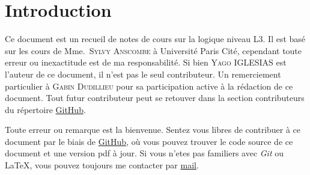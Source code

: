 \section{Introduction}

Ce document est un recueil de notes de cours sur la logique niveau L3. Il est
basé sur les cours de Mme.~\textsc{Sylvy Anscombe} à Université Paris Cité, cependant toute
erreur ou inexactitude est de ma responsabilité.
Si bien \textsc{Yago IGLESIAS} est l'auteur de ce document, il n'est pas
le seul contributeur. Un remerciement particulier à \textsc{Gabin Dudillieu} pour sa
participation active à la rédaction de ce document. Tout futur contributeur
peut se retouver dans la section contributeurs du répertoire
\href{https://github.com/Yag000/logique-notes/graphs/contributors}{GitHub}.
\vspace{0.5cm}

Toute erreur ou remarque est la bienvenue.
Sentez vous libres de contribuer à ce document par le biais de \href{https://github.com/Yag000/logique-notes}{GitHub},
où vous pouvez trouver le code source de ce document et une version pdf à jour.
Si vous n'etes pas familiers avec \textit{Git} ou \LaTeX , vous pouvez toujours me contacter
par \href{mailto: yago.iglesias.vazquez@gmail.com}{mail}.







